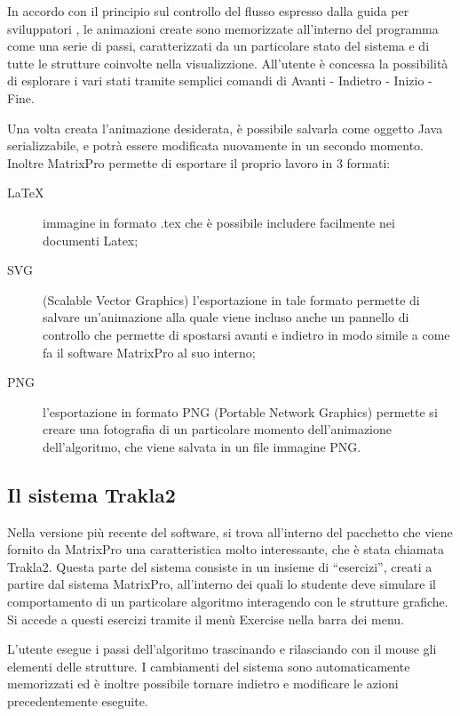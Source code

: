 In accordo con il principio sul controllo del flusso espresso dalla
guida per sviluppatori \cite{wikiAlgoViz}, le animazioni create sono
memorizzate all'interno del programma come una serie di passi, caratterizzati
da un particolare stato del sistema e di tutte le strutture coinvolte
nella visualizzione. All'utente è concessa la possibilità di esplorare
i vari stati tramite semplici comandi di Avanti - Indietro - Inizio
- Fine.

Una volta creata l'animazione desiderata, è possibile salvarla come
oggetto Java serializzabile, e potrà essere modificata nuovamente
in un secondo momento. Inoltre MatrixPro permette di esportare il
proprio lavoro in 3 formati:
\begin{description}
\item [{\LaTeX{}}] immagine in formato .tex che è possibile includere facilmente
nei documenti Latex;
\item [{SVG}] (Scalable Vector Graphics) l'esportazione in tale formato
permette di salvare un'animazione alla quale viene incluso anche un
pannello di controllo che permette di spostarsi avanti e indietro
in modo simile a come fa il software MatrixPro al suo interno;
\item [{PNG}] l'esportazione in formato PNG (Portable Network Graphics)
permette si creare una fotografia di un particolare momento dell'animazione
dell'algoritmo, che viene salvata in un file immagine PNG.
\end{description}

\subsection{Il sistema Trakla2}

Nella versione più recente del software, si trova all'interno del
pacchetto che viene fornito da MatrixPro una caratteristica molto
interessante, che è stata chiamata Trakla2. Questa parte del sistema
consiste in un insieme di {}``esercizi'', creati a partire dal sistema
MatrixPro, all'interno dei quali lo studente deve simulare il comportamento
di un particolare algoritmo interagendo con le strutture grafiche.
Si accede a questi esercizi tramite il menù Exercise nella barra dei
menu.

L'utente esegue i passi dell'algoritmo trascinando e rilasciando con
il mouse gli elementi delle strutture. I cambiamenti del sistema sono
automaticamente memorizzati ed è inoltre possibile tornare indietro
e modificare le azioni precedentemente eseguite.

